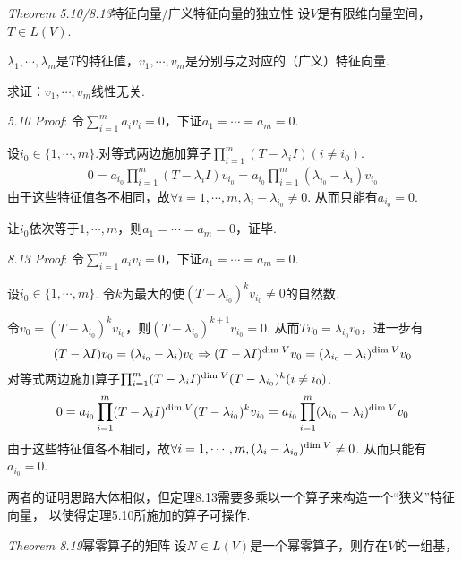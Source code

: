 \textit{Theorem 5.10/8.13}{\kaishu 特征向量/广义特征向量的独立性}
设\(V\)是有限维向量空间，\(T \in L(V)\).

\(\lambda_1,\cdots,\lambda_m\)是\(T\)的特征值，\(v_1,\cdots,v_m\)是分别与之对应的（广义）特征向量.

求证：\(v_1,\cdots,v_m\)线性无关.

\textit{5.10 Proof}:
令\(\sum_{i=1}^m a_iv_i=0\)，下证\(a_1=\cdots=a_m=0\).

设\(i_0 \in \{1,\cdots,m\}\).对等式两边施加算子\(\prod_{i=1}^m (T-\lambda_i I)(i \ne i_0)\).
    \begin{align*}
        0=a_{i_0}\prod_{i=1}^m (T-\lambda_i I) v_{i_0}=
        a_{i_0}\prod_{i=1}^m (\lambda_{i_0}-\lambda_i) v_{i_0}
    \end{align*}
由于这些特征值各不相同，故\(\forall i=1,\cdots,m,\lambda_i-\lambda_{i_0} \ne 0\).
从而只能有\(a_{i_0}=0\).

让\(i_0\)依次等于\(1,\cdots,m\)，则\(a_1=\cdots=a_m=0\)，证毕.

\textit{8.13 Proof}:
令\(\sum_{i=1}^m a_iv_i=0\)，下证\(a_1=\cdots=a_m=0\).

设\(i_0 \in \{1,\cdots,m\}\).
令\(k\)为最大的使\((T-\lambda_{i_0})^k v_{i_0} \ne 0\)的自然数.

令\(v_0=(T-\lambda_{i_0})^k v_{i_0}\)，则\((T-\lambda_{i_0})^{k+1} v_{i_0}=0\).
从而\(Tv_0=\lambda_{i_0}v_0\)，进一步有
    \begin{align*}
        (T-\lambda I)v_0=(\lambda_{i_0}-\lambda_i)v_0 \Rightarrow 
        (T-\lambda I)^{\mathrm{dim \;} V} v_0=(\lambda_{i_0}-\lambda_i)^{\mathrm{dim \;} V}v_0
    \end{align*}
对等式两边施加算子\(\prod_{i=1}^m (T-\lambda_i I)^{\mathrm{dim \;} V}(T-\lambda_{i_0})^k(i \ne i_0)\).
    \begin{align*}
        0=a_{i_0}\prod_{i=1}^m (T-\lambda_i I)^{\mathrm{dim \;} V}(T-\lambda_{i_0})^k v_{i_0}
        =a_{i_0}\prod_{i=1}^m (\lambda_{i_0}-\lambda_i)^{\mathrm{dim \;} V} v_0
    \end{align*}
由于这些特征值各不相同，故\(\forall i=1,\cdots,m,(\lambda_i-\lambda_{i_0})^{\mathrm{dim \;} V} \ne 0\).
从而只能有\(a_{i_0}=0\).

两者的证明思路大体相似，但定理8.13需要多乘以一个算子来构造一个“狭义”特征向量，
以使得定理5.10所施加的算子可操作.

\hspace*{\fill}

\textit{Theorem 8.19}{\kaishu 幂零算子的矩阵}
设\(N \in L(V)\)是一个幂零算子，则存在\(V\)的一组基，

